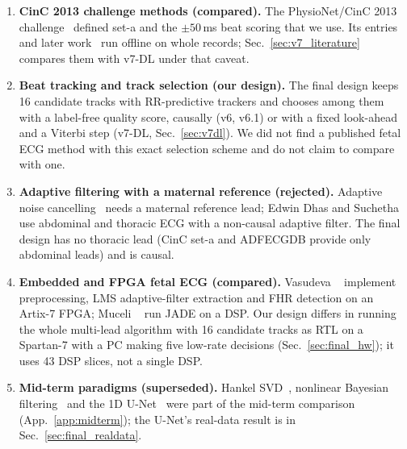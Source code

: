 \begin{finalpart}
\begin{enumerate}
    \item \textbf{CinC 2013 challenge methods (compared).} The PhysioNet/CinC 2013 challenge~\cite{silva2013} defined set-a and the $\pm 50\,$ms beat scoring that we use. Its entries and later work~\cite{behar2014b,andreotti2014} run offline on whole records; Sec.~\ref{sec:v7_literature} compares them with v7-DL under that caveat.
    \item \textbf{Beat tracking and track selection (our design).} The final design keeps 16 candidate tracks with RR-predictive trackers and chooses among them with a label-free quality score, causally (v6, v6.1) or with a fixed look-ahead and a Viterbi step (v7-DL, Sec.~\ref{sec:v7dl}). We did not find a published fetal ECG method with this exact selection scheme and do not claim to compare with one.
    \item \textbf{Adaptive filtering with a maternal reference (rejected).} Adaptive noise cancelling~\cite{widrow1975} needs a maternal reference lead; Edwin Dhas and Suchetha~\cite{edwin2022} use abdominal and thoracic ECG with a non-causal adaptive filter. The final design has no thoracic lead (CinC set-a and ADFECGDB provide only abdominal leads) and is causal.
    \item \textbf{Embedded and FPGA fetal ECG (compared).} Vasudeva \etal~\cite{vasudeva2020} implement preprocessing, LMS adaptive-filter extraction and FHR detection on an Artix-7 FPGA; Muceli \etal~\cite{muceli2007} run JADE on a DSP. Our design differs in running the whole multi-lead algorithm with 16 candidate tracks as RTL on a Spartan-7 with a PC making five low-rate decisions (Sec.~\ref{sec:final_hw}); it uses 43 DSP slices, not a single DSP.
    \item \textbf{Mid-term paradigms (superseded).} Hankel SVD~\cite{kanjilal1997,callaerts1990}, nonlinear Bayesian filtering~\cite{sameni2007} and the 1D U-Net~\cite{ronneberger2015} were part of the mid-term comparison (App.~\ref{app:midterm}); the U-Net's real-data result is in Sec.~\ref{sec:final_realdata}.
\end{enumerate}
\end{finalpart}
